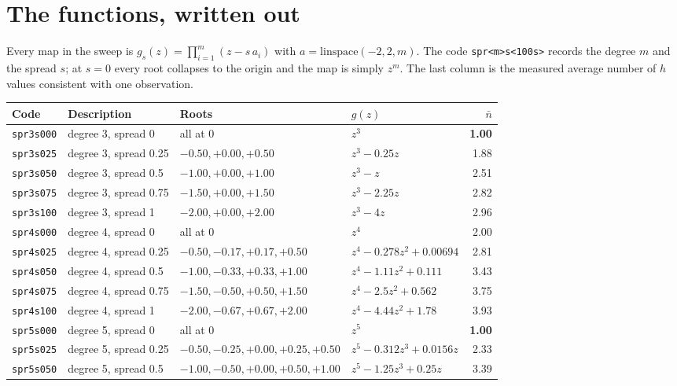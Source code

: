 \section{The functions, written out}
\label{sec:functions}

Every map in the sweep is $g_s(z)=\prod_{i=1}^{m}(z-s\,a_i)$ with
$a=\mathrm{linspace}(-2,2,m)$. The code \texttt{spr<m>s<100s>} records the
degree $m$ and the spread $s$; at $s=0$ every root collapses to the origin and
the map is simply $z^m$. The last column is the measured average number of $h$
values consistent with one observation.

\begin{center}
\footnotesize
\setlength{\tabcolsep}{4pt}
\begin{tabular}{@{}llll r@{}}
\toprule
Code & Description & Roots & $g(z)$ & $\bar n$ \\
\midrule
\texttt{spr3s000} & degree 3, spread 0 & all at $0$ & $z^{3}$ & \textbf{1.00} \\
\texttt{spr3s025} & degree 3, spread 0.25 & $-0.50,+0.00,+0.50$ & $z^{3} - 0.25z$ & 1.88 \\
\texttt{spr3s050} & degree 3, spread 0.5 & $-1.00,+0.00,+1.00$ & $z^{3} - z$ & 2.51 \\
\texttt{spr3s075} & degree 3, spread 0.75 & $-1.50,+0.00,+1.50$ & $z^{3} - 2.25z$ & 2.82 \\
\texttt{spr3s100} & degree 3, spread 1 & $-2.00,+0.00,+2.00$ & $z^{3} - 4z$ & 2.96 \\
\addlinespace
\texttt{spr4s000} & degree 4, spread 0 & all at $0$ & $z^{4}$ & 2.00 \\
\texttt{spr4s025} & degree 4, spread 0.25 & $-0.50,-0.17,+0.17,+0.50$ & $z^{4} - 0.278z^{2} + 0.00694$ & 2.81 \\
\texttt{spr4s050} & degree 4, spread 0.5 & $-1.00,-0.33,+0.33,+1.00$ & $z^{4} - 1.11z^{2} + 0.111$ & 3.43 \\
\texttt{spr4s075} & degree 4, spread 0.75 & $-1.50,-0.50,+0.50,+1.50$ & $z^{4} - 2.5z^{2} + 0.562$ & 3.75 \\
\texttt{spr4s100} & degree 4, spread 1 & $-2.00,-0.67,+0.67,+2.00$ & $z^{4} - 4.44z^{2} + 1.78$ & 3.93 \\
\addlinespace
\texttt{spr5s000} & degree 5, spread 0 & all at $0$ & $z^{5}$ & \textbf{1.00} \\
\texttt{spr5s025} & degree 5, spread 0.25 & $-0.50,-0.25,+0.00,+0.25,+0.50$ & $z^{5} - 0.312z^{3} + 0.0156z$ & 2.33 \\
\texttt{spr5s050} & degree 5, spread 0.5 & $-1.00,-0.50,+0.00,+0.50,+1.00$ & $z^{5} - 1.25z^{3} + 0.25z$ & 3.39 \\

\end{tabular}
\end{center}
